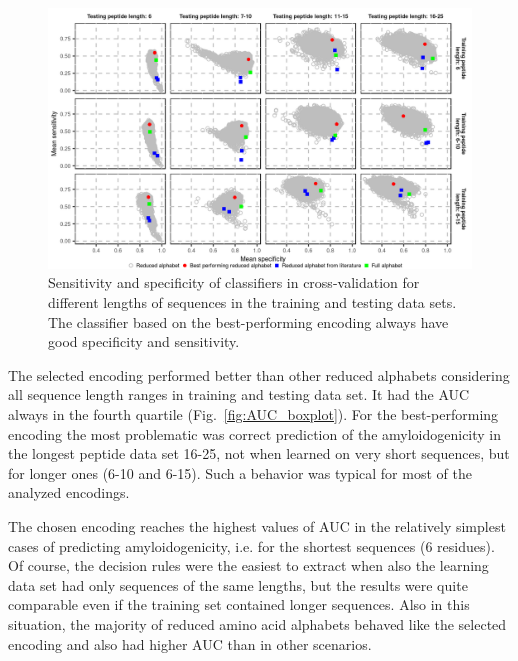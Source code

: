 \documentclass[a4,center,fleqn]{NAR}
\begin{document}
\begin{figure}[!tpb]
\centerline{\includegraphics{figures/sesp_plot.png}}
\caption{Sensitivity and specificity of classifiers in cross-validation for 
different lengths of sequences in the training and testing data sets.
The classifier based on the best-performing encoding always have 
good specificity and sensitivity.}\label{fig:sesp_plot}
\end{figure}

The selected encoding performed better than other reduced alphabets considering 
all sequence length ranges in training and testing data set. It had the AUC 
%
%
%
always in the fourth quartile (Fig.~\ref{fig:AUC_boxplot}). For the 
best-performing encoding the most problematic was correct prediction of the 
amyloidogenicity in the longest peptide data set 16-25, not when learned on very 
short sequences, but for longer ones (6-10 and 6-15). Such a behavior was 
typical for most of the analyzed encodings.

  The chosen encoding reaches the highest values of AUC in the relatively 
simplest cases of predicting amyloidogenicity, i.e. for the shortest sequences (6 
%
%
%
residues). Of course, the decision rules were the easiest to extract when also 
the learning data set had only sequences of the same lengths, but the results 
were quite comparable even if the training set contained longer sequences. Also 
in this situation, the majority of reduced amino acid alphabets behaved like the 
selected encoding and also had higher AUC than in other scenarios.
%
%
%
\end{document}
